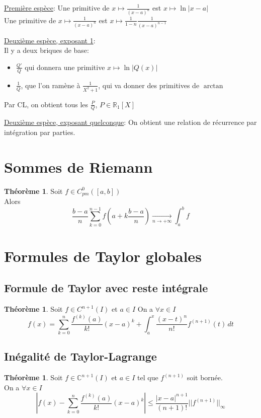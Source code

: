 \documentclass[10pt,a4paper]{article}
\theoremstyle{definition}
\newtheorem{theorem}[proposition]{Théorème}
\begin{document}
\noindent \uline{Première espèce}: Une primitive de $x \mapsto \frac{1}{(x - a)^n}$ est $x \mapsto \ln|x - a|$ \\
Une primitive de $x \mapsto \frac{1}{(x - a)^n}$ est $x \mapsto \frac{1}{1 - n} \frac{1}{(x - a)^{n - 1}}$ \medskip

\noindent \uline{Deuxième espèce, exposant 1}: \\
Il y a deux briques de base:
\begin{itemize}
\item $\frac{Q'}{Q}$ qui donnera une primitive $x \mapsto \ln|Q(x)|$
\item $\frac{1}{Q}$, que l'on ramène à $\frac{1}{X^2	+ 1}$, qui va donner des primitives de $\arctan$
\end{itemize}
Par CL, on obtient tous les $\frac{P}{Q}$, $P \in \mathbb{R}_1[X]$ \medskip

\noindent \uline{Deuxième espèce, exposant quelconque}: On obtient une relation de récurrence par intégration par parties.

\section{Sommes de Riemann}
\begin{theorem}
Soit $f \in C_{pm}^0([a, b])$ \\
Alors
\[ \frac{b - a}{n} \sum_{k = 0}^{n - 1} f\left( a + k \frac{b - a}{n}\right) \xrightarrow[n \to +\infty]{} \int_a^b f\]
\end{theorem}

\section{Formules de Taylor globales}
\subsection{Formule de Taylor avec reste intégrale}
\begin{theorem}
Soit $f \in C^{n + 1}(I)$ et $a \in I$
On a $\forall x \in I$
\[f(x) = \sum_{k = 0}^n \frac{f^{(k)}(a)}{k!}(x - a)^k + \int_a^x \frac{(x - t)^n}{n!} f^{(n + 1)}(t) \, dt\]
\end{theorem}

\subsection{Inégalité de Taylor-Lagrange}
\begin{theorem}
Soit $f \in \mathbb{C}^{n + 1}(I)$ et $a \in I$ tel que $f^{(n + 1)}$ soit bornée. \\
On a $\forall x \in I$
\[\left| f(x) - \sum_{k = 0}^n \frac{f^{(k)}(a)}{k!}(x - a)^k \right| \leq \frac{|x - a|^{n + 1}}{(n + 1)!} ||f^{(n + 1)}||_\infty\]
\end{theorem}
\end{document}
